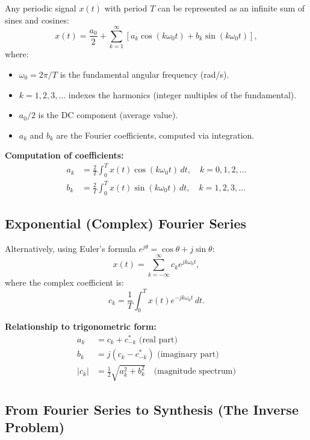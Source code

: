 \documentclass[11pt,letterpaper]{article}
\begin{document}
Any periodic signal $x(t)$ with period $T$ can be represented as an infinite sum of sines and cosines:
\begin{equation}
x(t) = \frac{a_0}{2} + \sum_{k=1}^{\infty} \left[ a_k \cos(k\omega_0 t) + b_k \sin(k\omega_0 t) \right],
\label{eq:fs_trig}
\end{equation}
where:
\begin{itemize}
    \item $\omega_0 = 2\pi / T$ is the fundamental angular frequency (rad/s).
    \item $k = 1, 2, 3, \ldots$ indexes the harmonics (integer multiples of the fundamental).
    \item $a_0 / 2$ is the DC component (average value).
    \item $a_k$ and $b_k$ are the Fourier coefficients, computed via integration.
\end{itemize}

\noindent
\textbf{Computation of coefficients:}
\begin{align}
a_k &= \frac{2}{T} \int_0^T x(t) \cos(k\omega_0 t) \, dt, \quad k = 0, 1, 2, \ldots \\
b_k &= \frac{2}{T} \int_0^T x(t) \sin(k\omega_0 t) \, dt, \quad k = 1, 2, 3, \ldots
\end{align}

\subsection{Exponential (Complex) Fourier Series}

Alternatively, using Euler's formula $e^{j\theta} = \cos\theta + j\sin\theta$:
\begin{equation}
x(t) = \sum_{k=-\infty}^{\infty} c_k e^{jk\omega_0 t},
\label{eq:fs_exp}
\end{equation}
where the complex coefficient is:
\begin{equation}
c_k = \frac{1}{T} \int_0^T x(t) e^{-jk\omega_0 t} \, dt.
\end{equation}

\noindent
\textbf{Relationship to trigonometric form:}
\begin{align}
a_k &= c_k + c_{-k}^* \text{ (real part)} \\
b_k &= j(c_k - c_{-k}^*) \text{ (imaginary part)} \\
|c_k| &= \frac{1}{2}\sqrt{a_k^2 + b_k^2} \quad \text{(magnitude spectrum)}
\end{align}

\subsection{From Fourier Series to Synthesis (The Inverse Problem)}
\end{document}
